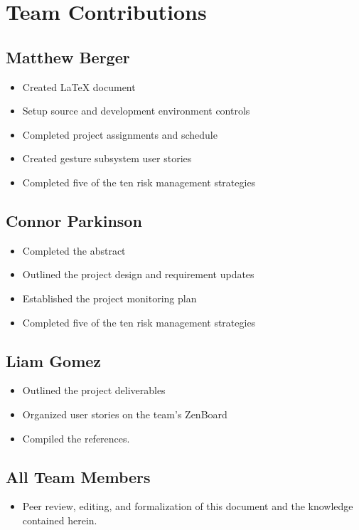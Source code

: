 \documentclass{scrreprt}
\begin{document}
\chapter{Team Contributions}
	\section{Matthew Berger}
		\begin{itemize}
			\item Created LaTeX document
			\item Setup source and development environment controls
			\item Completed project assignments and schedule
			\item Created gesture subsystem user stories
			\item Completed five of the ten risk management strategies
		\end{itemize}
	\section{Connor Parkinson}
		\begin{itemize}
			\item Completed the abstract
			\item Outlined the project design and requirement updates
			\item Established the project monitoring plan
			\item Completed five of the ten risk management strategies
		\end{itemize}
	\section{Liam Gomez}
		\begin{itemize}
			\item Outlined the project deliverables
			\item Organized user stories on the team’s ZenBoard
			\item Compiled the references.
		\end{itemize}
	\section{All Team Members}
		\begin{itemize}
			\item Peer review, editing, and formalization of this document and the knowledge contained herein.
		\end{itemize}
\end{document}
